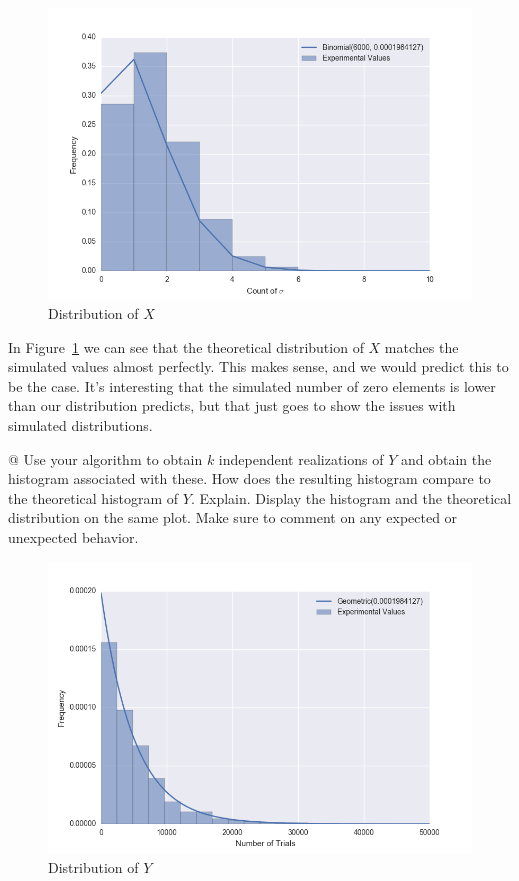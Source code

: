 \documentclass[11pt]{article}
\begin{document}
\begin{easylist}[enumerate]
        \begin{figure}[H]
            \centering
            \includegraphics[scale=0.75]{./distx.png}
            \caption{Distribution of $X$}
            \label{fig:distx}
        \end{figure}

        In Figure~\ref{fig:distx} we can see that the theoretical distribution
        of $X$ matches the simulated values almost perfectly. This makes sense,
        and we would predict this to be the case. It's interesting that the
        simulated number of zero elements is lower than our distribution
        predicts, but that just goes to show the issues with simulated
        distributions.

        @ Use your algorithm to obtain $k$ independent realizations of $Y$ and
        obtain the histogram associated with these. How does the resulting
        histogram compare to the theoretical histogram of $Y$. Explain. Display
        the histogram and the theoretical distribution on the same plot. Make
        sure to comment on any expected or unexpected behavior.

        \begin{figure}[H]
            \centering
            \includegraphics[scale=0.75]{./disty.png}
            \caption{Distribution of $Y$}
            \label{fig:disty}
        \end{figure}


\end{easylist}
\end{document}
